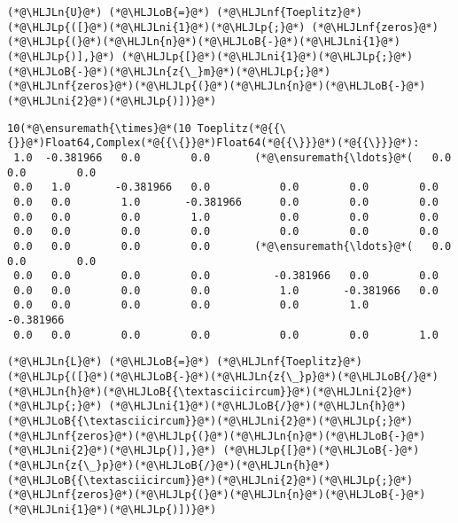 \documentclass[12pt,a4paper]{article}
\newcommand{\HLJLn}[1]{#1}
\newcommand{\HLJLnf}[1]{\textcolor[RGB]{66,102,213}{#1}}
\newcommand{\HLJLni}[1]{\textcolor[RGB]{59,151,46}{#1}}
\newcommand{\HLJLoB}[1]{\textcolor[RGB]{102,102,102}{\textbf{#1}}}
\newcommand{\HLJLp}[1]{#1}
\begin{document}
\begin{lstlisting}
(*@\HLJLn{U}@*) (*@\HLJLoB{=}@*) (*@\HLJLnf{Toeplitz}@*)(*@\HLJLp{([}@*)(*@\HLJLni{1}@*)(*@\HLJLp{;}@*) (*@\HLJLnf{zeros}@*)(*@\HLJLp{(}@*)(*@\HLJLn{n}@*)(*@\HLJLoB{-}@*)(*@\HLJLni{1}@*)(*@\HLJLp{)],}@*) (*@\HLJLp{[}@*)(*@\HLJLni{1}@*)(*@\HLJLp{;}@*) (*@\HLJLoB{-}@*)(*@\HLJLn{z{\_}m}@*)(*@\HLJLp{;}@*) (*@\HLJLnf{zeros}@*)(*@\HLJLp{(}@*)(*@\HLJLn{n}@*)(*@\HLJLoB{-}@*)(*@\HLJLni{2}@*)(*@\HLJLp{)])}@*)
\end{lstlisting}

\begin{lstlisting}
10(*@\ensuremath{\times}@*(10 Toeplitz(*@{{\{}}@*)Float64,Complex(*@{{\{}}@*)Float64(*@{{\}}}@*)(*@{{\}}}@*):
 1.0  -0.381966   0.0        0.0       (*@\ensuremath{\ldots}@*(   0.0        0.0        0.0
 0.0   1.0       -0.381966   0.0           0.0        0.0        0.0
 0.0   0.0        1.0       -0.381966      0.0        0.0        0.0
 0.0   0.0        0.0        1.0           0.0        0.0        0.0
 0.0   0.0        0.0        0.0           0.0        0.0        0.0
 0.0   0.0        0.0        0.0       (*@\ensuremath{\ldots}@*(   0.0        0.0        0.0
 0.0   0.0        0.0        0.0          -0.381966   0.0        0.0
 0.0   0.0        0.0        0.0           1.0       -0.381966   0.0
 0.0   0.0        0.0        0.0           0.0        1.0       -0.381966
 0.0   0.0        0.0        0.0           0.0        0.0        1.0
\end{lstlisting}


\begin{lstlisting}
(*@\HLJLn{L}@*) (*@\HLJLoB{=}@*) (*@\HLJLnf{Toeplitz}@*)(*@\HLJLp{([}@*)(*@\HLJLoB{-}@*)(*@\HLJLn{z{\_}p}@*)(*@\HLJLoB{/}@*)(*@\HLJLn{h}@*)(*@\HLJLoB{{\textasciicircum}}@*)(*@\HLJLni{2}@*)(*@\HLJLp{;}@*) (*@\HLJLni{1}@*)(*@\HLJLoB{/}@*)(*@\HLJLn{h}@*)(*@\HLJLoB{{\textasciicircum}}@*)(*@\HLJLni{2}@*)(*@\HLJLp{;}@*) (*@\HLJLnf{zeros}@*)(*@\HLJLp{(}@*)(*@\HLJLn{n}@*)(*@\HLJLoB{-}@*)(*@\HLJLni{2}@*)(*@\HLJLp{)],}@*) (*@\HLJLp{[}@*)(*@\HLJLoB{-}@*)(*@\HLJLn{z{\_}p}@*)(*@\HLJLoB{/}@*)(*@\HLJLn{h}@*)(*@\HLJLoB{{\textasciicircum}}@*)(*@\HLJLni{2}@*)(*@\HLJLp{;}@*) (*@\HLJLnf{zeros}@*)(*@\HLJLp{(}@*)(*@\HLJLn{n}@*)(*@\HLJLoB{-}@*)(*@\HLJLni{1}@*)(*@\HLJLp{)])}@*)
\end{lstlisting}
\end{document}
